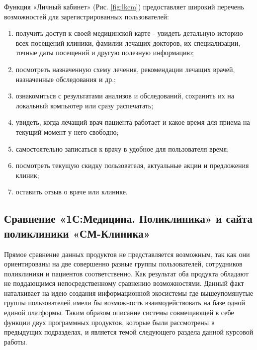 \documentclass[14pt,a4paper,russian]{extreport}
\begin{document}
\cleardoublepage
Функция «Личный кабинет» (Рис. \ref{fig:lkcm}) предоставляет широкий перечень возможностей для зарегистрированных
пользователей:\cite{smclin}

\begin{enumerate}[noitemsep]
    \item получить доступ к своей медицинской карте - увидеть детальную историю всех посещений
        клиники, фамилии лечащих докторов, их специализации, точные даты посещений и другую
        полезную информацию;

    \item посмотреть назначенную схему лечения, рекомендации лечащих врачей, назначенные
        обследования и др.;

    \item ознакомиться с результатами анализов и обследований, сохранить их на локальный компьютер или
        сразу распечатать;

    \item увидеть, когда лечащий врач пациента работает и какое время для приема на текущий момент у него
        свободно;

    \item самостоятельно записаться к врачу в удобное для пользователя время;

    \item посмотреть текущую скидку пользователя, актуальные акции и предложения клиник;

    \item оставить отзыв о враче или клинике.
\end{enumerate}

\subsection{Сравнение «1С:Медицина. Поликлиника» и сайта поликлиники «СМ-Клиника»}
Прямое сравнение данных продуктов не представляется возможным, так как они ориентированы на две
совершенно разные группы пользователей, сотрудников поликлиники и пациентов соответственно. Как
результат оба продукта обладают не поддающимся непосредственному сравнению возможностями. Данный факт
наталкивает на идею создания информационной экосистемы где вышеупомянутые группы пользователей
имели бы возможность взаимодействовать на базе одной единой платформы. Таким образом описание
системы совмещающей в себе функции двух программных продуктов, которые были рассмотрены в
предыдущих подразделах, и является темой следующего раздела данной курсовой работы.
\end{document}
